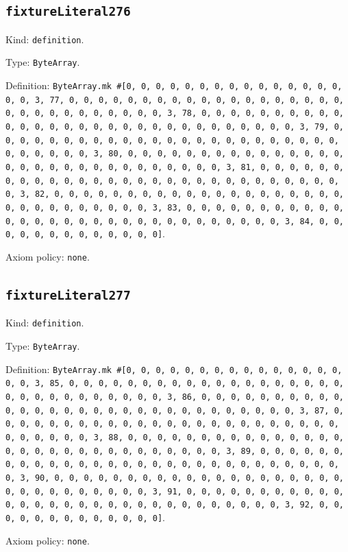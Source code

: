 \documentclass[11pt]{article}
\begin{document}
\subsection*{\texttt{fixtureLiteral276}}
\noindent Kind: \texttt{definition}.\par
\noindent Type: \texttt{ByteArray}.\par
\noindent Definition: \texttt{ByteArray.mk \#[0, 0, 0, 0, 0, 0, 0, 0, 0, 0, 0, 0, 0, 0, 0, 0, 0, 3, 77, 0, 0, 0, 0, 0, 0, 0, 0, 0, 0, 0, 0, 0, 0, 0, 0, 0, 0, 0, 0, 0, 0, 0, 0, 0, 0, 0, 0, 0, 0, 3, 78, 0, 0, 0, 0, 0, 0, 0, 0, 0, 0, 0, 0, 0, 0, 0, 0, 0, 0, 0, 0, 0, 0, 0, 0, 0, 0, 0, 0, 0, 0, 3, 79, 0, 0, 0, 0, 0, 0, 0, 0, 0, 0, 0, 0, 0, 0, 0, 0, 0, 0, 0, 0, 0, 0, 0, 0, 0, 0, 0, 0, 0, 0, 3, 80, 0, 0, 0, 0, 0, 0, 0, 0, 0, 0, 0, 0, 0, 0, 0, 0, 0, 0, 0, 0, 0, 0, 0, 0, 0, 0, 0, 0, 0, 0, 3, 81, 0, 0, 0, 0, 0, 0, 0, 0, 0, 0, 0, 0, 0, 0, 0, 0, 0, 0, 0, 0, 0, 0, 0, 0, 0, 0, 0, 0, 0, 0, 3, 82, 0, 0, 0, 0, 0, 0, 0, 0, 0, 0, 0, 0, 0, 0, 0, 0, 0, 0, 0, 0, 0, 0, 0, 0, 0, 0, 0, 0, 0, 0, 3, 83, 0, 0, 0, 0, 0, 0, 0, 0, 0, 0, 0, 0, 0, 0, 0, 0, 0, 0, 0, 0, 0, 0, 0, 0, 0, 0, 0, 0, 0, 0, 3, 84, 0, 0, 0, 0, 0, 0, 0, 0, 0, 0, 0, 0, 0]}.\par
\noindent Axiom policy: \texttt{none}.\par
\subsection*{\texttt{fixtureLiteral277}}
\noindent Kind: \texttt{definition}.\par
\noindent Type: \texttt{ByteArray}.\par
\noindent Definition: \texttt{ByteArray.mk \#[0, 0, 0, 0, 0, 0, 0, 0, 0, 0, 0, 0, 0, 0, 0, 0, 0, 3, 85, 0, 0, 0, 0, 0, 0, 0, 0, 0, 0, 0, 0, 0, 0, 0, 0, 0, 0, 0, 0, 0, 0, 0, 0, 0, 0, 0, 0, 0, 0, 3, 86, 0, 0, 0, 0, 0, 0, 0, 0, 0, 0, 0, 0, 0, 0, 0, 0, 0, 0, 0, 0, 0, 0, 0, 0, 0, 0, 0, 0, 0, 0, 3, 87, 0, 0, 0, 0, 0, 0, 0, 0, 0, 0, 0, 0, 0, 0, 0, 0, 0, 0, 0, 0, 0, 0, 0, 0, 0, 0, 0, 0, 0, 0, 3, 88, 0, 0, 0, 0, 0, 0, 0, 0, 0, 0, 0, 0, 0, 0, 0, 0, 0, 0, 0, 0, 0, 0, 0, 0, 0, 0, 0, 0, 0, 0, 3, 89, 0, 0, 0, 0, 0, 0, 0, 0, 0, 0, 0, 0, 0, 0, 0, 0, 0, 0, 0, 0, 0, 0, 0, 0, 0, 0, 0, 0, 0, 0, 3, 90, 0, 0, 0, 0, 0, 0, 0, 0, 0, 0, 0, 0, 0, 0, 0, 0, 0, 0, 0, 0, 0, 0, 0, 0, 0, 0, 0, 0, 0, 0, 3, 91, 0, 0, 0, 0, 0, 0, 0, 0, 0, 0, 0, 0, 0, 0, 0, 0, 0, 0, 0, 0, 0, 0, 0, 0, 0, 0, 0, 0, 0, 0, 3, 92, 0, 0, 0, 0, 0, 0, 0, 0, 0, 0, 0, 0, 0]}.\par
\noindent Axiom policy: \texttt{none}.\par
\end{document}
